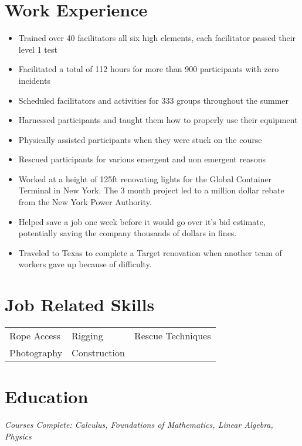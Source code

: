 \documentclass{my_resume}
\begin{document}
	\splitheader
	\section{Work Experience}
	
			\begin{itemize}
				\item Trained over 40 facilitators all six high elements, each facilitator passed their level 1 test
				\item Facilitated a total of 112 hours for more than 900 participants with zero incidents
				\item Scheduled facilitators and activities for 333 groups throughout the summer
			\end{itemize}
	
			\begin{itemize}
				\item Harnessed participants and taught them how to properly use their equipment
				\item Physically assisted participants when they were stuck on the course
				\item Rescued participants for various emergent and non emergent reasons
			\end{itemize}
	
			\begin{itemize}
				\item Worked at a height of 125ft renovating lights for the Global Container Terminal in New York. The 3 month project led to a million dollar rebate from the New York Power Authority.
				\item Helped save a job one week before it would go over it's bid estimate, potentially saving the company thousands of dollars in fines.
				\item Traveled to Texas to complete a Target renovation when another team of workers gave up because of difficulty.
			\end{itemize}

	\section{Job Related Skills}
		\begin{tabular}{l l l}
			Rope Access & Rigging & Rescue Techniques \\
			Photography & Construction
		\end{tabular}
	
	\section{Education}
		\scriptsize{\textit{Courses Complete: Calculus, Foundations of Mathematics, Linear Algebra, Physics}}
\end{document}
